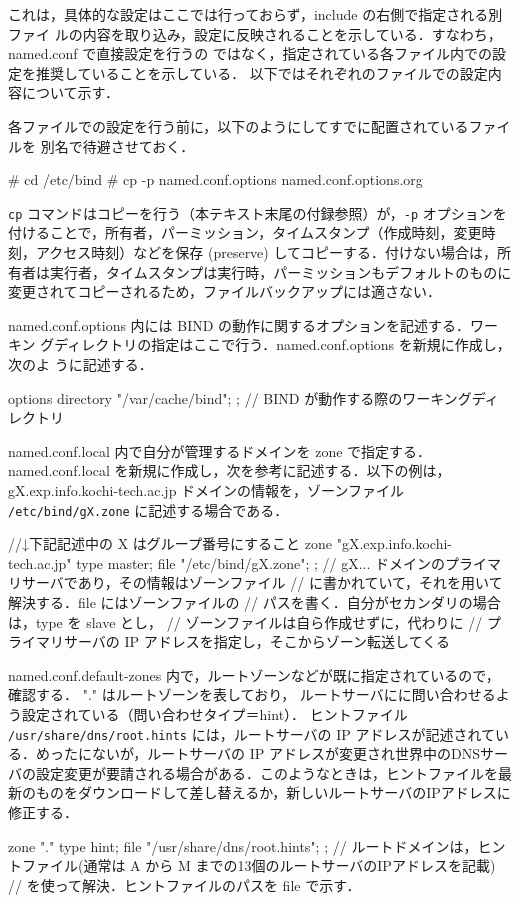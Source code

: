 これは，具体的な設定はここでは行っておらず，include の右側で指定される別ファイ
ルの内容を取り込み，設定に反映されることを示している．すなわち，named.conf で直接設定を行うの
ではなく，指定されている各ファイル内での設定を推奨していることを示している．
以下ではそれぞれのファイルでの設定内容について示す．

各ファイルでの設定を行う前に，以下のようにしてすでに配置されているファイルを
別名で待避させておく．
\begin{cli}
# cd /etc/bind
# cp -p named.conf.options named.conf.options.org
\end{cli}

\texttt{cp} コマンドはコピーを行う（本テキスト末尾の付録参照）が，\texttt{-p} オプションを付けることで，所有者，パーミッション，タイムスタンプ（作成時刻，変更時刻，アクセス時刻）などを保存 (preserve) してコピーする．付けない場合は，所有者は実行者，タイムスタンプは実行時，パーミッションもデフォルトのものに変更されてコピーされるため，ファイルバックアップには適さない．

named.conf.options 内には BIND の動作に関するオプションを記述する．ワーキン
グディレクトリの指定はここで行う．named.conf.options を新規に作成し，次のよ
うに記述する．
\begin{cli}
options {
    directory    "/var/cache/bind";
};
// BIND が動作する際のワーキングディレクトリ
\end{cli}

named.conf.local 内で自分が管理するドメインを zone で指定する．named.conf.local 
を新規に作成し，次を参考に記述する．以下の例は，gX.exp.info.kochi-tech.ac.jp 
ドメインの情報を，ゾーンファイル \texttt{/etc/bind/gX.zone} に記述する場合である．
\begin{cli}
//↓下記記述中の X はグループ番号にすること
zone    "gX.exp.info.kochi-tech.ac.jp" {
    type    master;
    file    "/etc/bind/gX.zone";
};
// gX... ドメインのプライマリサーバであり，その情報はゾーンファイル
// に書かれていて，それを用いて解決する．file にはゾーンファイルの
// パスを書く．自分がセカンダリの場合は，type を slave とし，
// ゾーンファイルは自ら作成せずに，代わりに
// プライマリサーバの IP アドレスを指定し，そこからゾーン転送してくる
\end{cli}

named.conf.default-zones 内で，ルートゾーンなどが既に指定されているので，確認する．
"." はルートゾーンを表しており，
ルートサーバにに問い合わせるよう設定されている（問い合わせタイプ＝hint）．
ヒントファイル \texttt{/usr/share/dns/root.hints} には，ルートサーバの IP アドレスが記述されている．めったにないが，ルートサーバの IP アドレスが変更され世界中のDNSサーバの設定変更が要請される場合がある．このようなときは，ヒントファイルを最新のものをダウンロードして差し替えるか，新しいルートサーバのIPアドレスに修正する．
\begin{cli}
zone "." {
    type    hint;
    file    "/usr/share/dns/root.hints";
};
// ルートドメインは，ヒントファイル(通常は A から M までの13個のルートサーバのIPアドレスを記載)
// を使って解決．ヒントファイルのパスを file で示す．
\end{cli}

